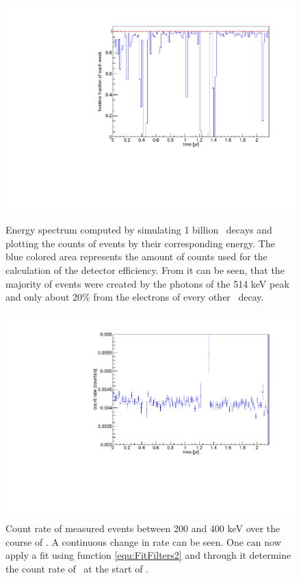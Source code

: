 \documentclass[encoding=utf8,british]{tumphthesis}
\begin{document}
\begin{figure}[t!]
	\centering
	\begin{minipage}[t]{.475\textwidth}
		\centering
		\includegraphics[width=\textwidth]{./Bilder/onceInALivetime.pdf}
		\caption{
			Energy spectrum computed by simulating 1 billion \Kr\ decays and plotting the counts of events by their corresponding energy.
			The blue colored area represents the amount of counts used for the calculation of the detector efficiency.
			From it can be seen, that the majority of events were created by the photons of the 514 keV peak and only about 20$\%$ from the electrons of every other \Kr\ decay.
		}
		\label{fig:livetime}
	\end{minipage}\hfill%
	\begin{minipage}[t]{.475\textwidth}
		\centering
		\includegraphics[width=\textwidth]{./Bilder/eventRate.pdf}
		\caption{
			Count rate of measured events between 200 and 400 keV over the course of \PII.
			A continuous change in rate can be seen. 
			One can now apply a fit using function \ref{equ:FitFilters2} and through it determine the count rate of \Kr\ at the start of \PII.
		}
		\label{fig:ChangeInEventRate}
	\end{minipage}
\end{figure}
\end{document}
